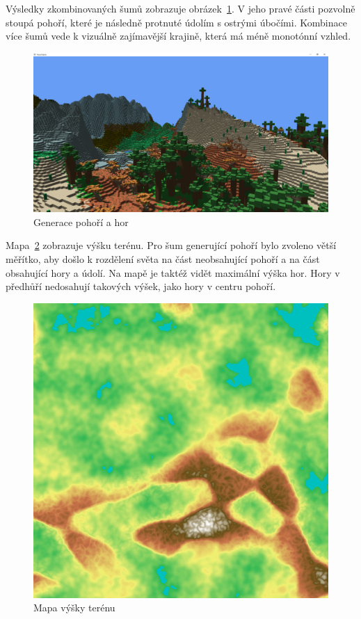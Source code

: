 \documentclass[thesis=M,czech]{FITthesis}[2019/12/23]
\begin{document}
Výsledky zkombinovaných šumů zobrazuje obrázek~\ref{fig:mountains}. V jeho pravé části pozvolně stoupá pohoří, které je následně protnuté údolím s ostrými úbočími. Kombinace více šumů vede k vizuálně zajímavější krajině, která má méně monotónní vzhled.

\begin{figure}\centering
	\includegraphics[width=\textwidth]{images/world_gen/mountains}
	\caption[Generace pohoří a hor]{Generace pohoří a hor}\label{fig:mountains}
\end{figure}

Mapa~\ref{fig:height} zobrazuje výšku terénu. Pro šum generující pohoří bylo zvoleno větší měřítko, aby došlo k rozdělení světa na část neobsahující pohoří a na část obsahující hory a údolí. Na mapě je taktéž vidět maximální výška hor. Hory v předhůří nedosahují takových výšek, jako hory v centru pohoří.

\begin{figure}\centering
	\includegraphics[width=\textwidth]{images/world_gen/height}
	\caption[Mapa výšky terénu]{Mapa výšky terénu}\label{fig:height}
\end{figure}
\end{document}

